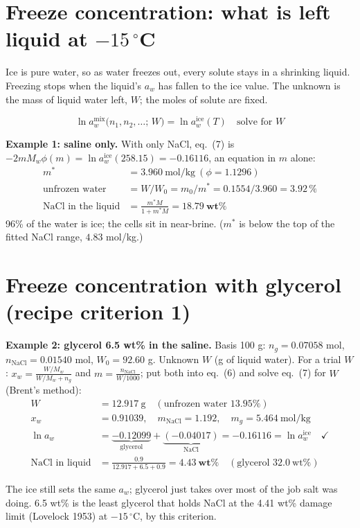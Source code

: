 \documentclass[11pt,a4paper]{article}
\newcommand{\aice}{\ln a_w^{\mathrm{ice}}}
\begin{document}
\section{Freeze concentration: what is left liquid at $-15\,^\circ$C}
Ice is pure water, so as water freezes out, every solute stays in a shrinking liquid. Freezing stops when the liquid's
$a_w$ has fallen to the ice value. The unknown is the mass of liquid water left, $W$; the moles of solute are fixed.
\begin{eqbox}
\[ \ln a_w^{\mathrm{mix}}\big(n_1,n_2,\dots;\,W\big)=\aice(T)\quad\text{solve for } W \tag{7}\]
\end{eqbox}
\textbf{Example 1: saline only.} With only NaCl, eq.~(7) is $-2mM_w\phi(m)=\aice(258.15)=-0.16116$, an equation in $m$ alone:
\begin{align*}
m^{*}&=3.960\ \text{mol/kg}\ (\phi=1.1296)\\
\text{unfrozen water}&=W/W_0=m_0/m^{*}=0.1554/3.960=\mathbf{3.92\,\%}\\
\text{NaCl in the liquid}&=\frac{m^{*}M}{1+m^{*}M}=\mathbf{18.79\ wt\%}
\end{align*}
96\% of the water is ice; the cells sit in near-brine. ($m^{*}$ is below the top of the fitted NaCl range, $4.83$ mol/kg.)

\section{Freeze concentration with glycerol (recipe criterion 1)}
\textbf{Example 2: glycerol 6.5 wt\% in the saline.} Basis 100 g: $n_g=0.07058$ mol, $n_{\text{NaCl}}=0.01540$ mol,
$W_0=92.60$ g. Unknown $W$ (g of liquid water). For a trial $W$:
$x_w=\frac{W/M_w}{W/M_w+n_g}$ and $m=\frac{n_{\text{NaCl}}}{W/1000}$; put both into eq.~(6) and solve eq.~(7) for $W$ (Brent's method):
\begin{align*}
W&=12.917\ \text{g}\quad(\text{unfrozen water } 13.95\%)\\ x_w&=0.91039,\quad m_{\text{NaCl}}=1.192,\quad m_g=5.464\ \text{mol/kg}\\
\ln a_w&=\underbrace{-0.12099}_{\text{glycerol}}+\underbrace{(-0.04017)}_{\text{NaCl}}=-0.16116=\aice\quad\checkmark\\
\text{NaCl in liquid}&=\frac{0.9}{12.917+6.5+0.9}=\mathbf{4.43\ wt\%}\quad(\text{glycerol } 32.0\ \text{wt\%})
\end{align*}
\begin{result}
The ice still sets the same $a_w$; glycerol just takes over most of the job salt was doing. 6.5 wt\% is the least
glycerol that holds NaCl at the 4.41 wt\% damage limit (Lovelock 1953) at $-15\,^\circ$C, by this criterion.
\end{result}
\end{document}
